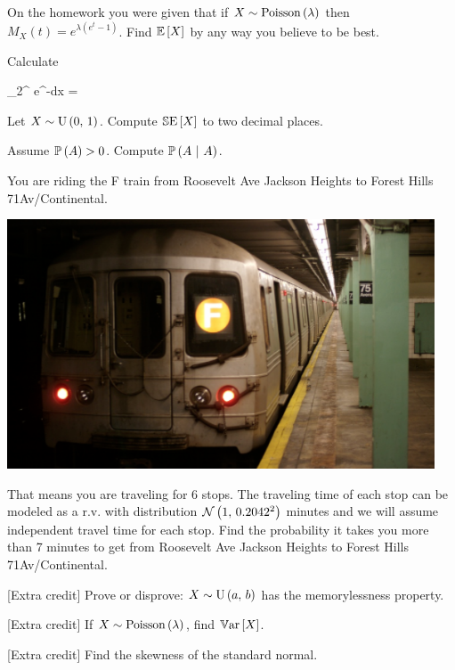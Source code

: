 \documentclass[12pt]{article}
\begin{document}
 On the homework you were given that if $X \sim \mathrm{Poisson}\left(\lambda\right)$ then $M_X(t) = e^{\lambda(e^t - 1)}$. Find $\mathbb{E}\left[X\right]$ by any way you believe to be best.


 Calculate 

\beqn
\int_2^\infty \oneoversqrt{2\pi} e^{-\half{}}dx = \quad\quad\quad\quad\quad\quad\quad\quad\quad\quad\quad\quad\quad\quad\quad\quad\quad\quad\quad\quad\quad\quad\quad\quad\quad\quad\quad\quad
\eeqn{}

 Let $X \sim \mathrm{U}\left(0,\,1\right)$. Compute $\mathbb{S}\text{E}\left[X\right]$ to two decimal places.


 Assume $\mathbb{P}\left(A\right) > 0$. Compute $\mathbb{P}\left(A~|~A\right)$. 

 You are riding the F train from Roosevelt Ave Jackson Heights to Forest Hills 71Av/Continental. 


\begin{center}
\includegraphics[width=5in]{f_train.png}
\end{center}

\noindent That means you are traveling for 6 stops. The traveling time of each stop can be modeled as a r.v. with distribution $\mathcal{N}\left(1,\,0.2042^2\right)$ minutes and we will assume independent travel time for each stop. Find the probability it takes you more than 7 minutes to get from Roosevelt Ave Jackson Heights to Forest Hills 71Av/Continental.


 [Extra credit] Prove or disprove: $X \sim \mathrm{U}\left(a,\,b\right)$ has the memorylessness property. 

 [Extra credit] If $X \sim \mathrm{Poisson}\left(\lambda\right)$, find $\mathbb{V}\text{ar}\left[X\right]$. 

 [Extra credit] Find the skewness of the standard normal. 


\eenum
\end{document}
